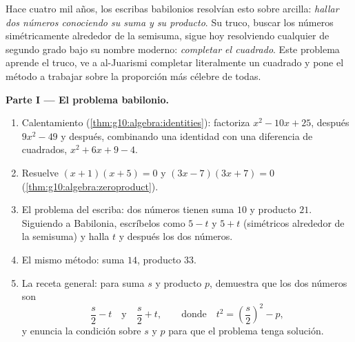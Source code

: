 \begin{problem}[{Problema de fin de semana --- problemas de suma y
producto, completar el cuadrado tal como lo dibujaba al-Juarismi y la
ecuación $x^2 = x + 1$}]
\label{pb:g10:algebra:1}
Hace cuatro mil años, los escribas babilonios resolvían esto sobre
arcilla: \emph{hallar dos números conociendo su suma y su producto}. Su
truco, buscar los números simétricamente alrededor de la semisuma, sigue
hoy resolviendo cualquier  de segundo grado bajo su nombre
moderno: \emph{completar el cuadrado}. Este problema aprende el truco, ve
a al-Juarismi completar literalmente un cuadrado y pone el método a
trabajar sobre la proporción más célebre de todas.

\medskip
\noindent\textbf{Parte I --- El problema babilonio.}
\begin{enumerate}
  \item Calentamiento (\cref{thm:g10:algebra:identities}): factoriza
        $x^2 - 10x + 25$, después $9x^2 - 49$ y después, combinando una
        identidad con una diferencia de cuadrados, $x^2 + 6x + 9 - 4$.
  \item Resuelve $(x + 1)(x + 5) = 0$ y $(3x - 7)(3x + 7) = 0$
        (\cref{thm:g10:algebra:zeroproduct}).
  \item El problema del escriba: dos números tienen suma $10$ y producto
        $21$. Siguiendo a Babilonia, escríbelos como $5 - t$ y $5 + t$
        (simétricos alrededor de la semisuma) y halla $t$ y después los
        dos números.
  \item El mismo método: suma $14$, producto $33$.
  \item La receta general: para suma $s$ y producto $p$, demuestra que los
        dos números son
        \[
        \frac s2 - t
        \quad\text{y}\quad
        \frac s2 + t,
        \qquad\text{donde}\quad
        t^2 = \left(\frac s2\right)^2 - p ,
        \]
        y enuncia la condición sobre $s$ y $p$ para que el problema tenga
        solución.
\end{enumerate}


\end{problem}
